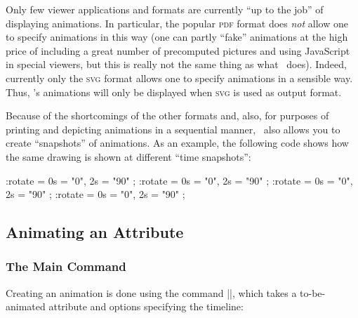 Only few viewer applications and formats are currently ``up to the job'' of
displaying animations.  In particular, the popular \textsc{pdf} format does
\emph{not} allow one to specify animations in this way (one can partly ``fake''
animations at the high price of including a great number of precomputed
pictures and using JavaScript in special viewers, but this is really not the
same thing as what \pgfname\ does). Indeed, currently only the  \textsc{svg}
format allows one to specify animations in a sensible way. Thus, \pgfname's
animations will only be displayed when \textsc{svg} is used as output format.

Because of the shortcomings of the other formats and, also, for purposes of
printing and depicting animations in a sequential manner, \pgfname\ also allows
you to create ``snapshots'' of animations. As an example, the following code
shows how the same drawing is shown at different ``time snapshots'':
%
\begin{codeexample}[width=3.9cm]
\tikz [make snapshot of=0.5s] \scoped :rotate = { 0s = "0", 2s = "90" }
  \node [draw=blue, very thick] {\pgfname};
\tikz [make snapshot of=1s]   \scoped :rotate = { 0s = "0", 2s = "90" }
  \node [draw=blue, very thick] {\pgfname};
\tikz [make snapshot of=1.5s] \scoped :rotate = { 0s = "0", 2s = "90" }
  \node [draw=blue, very thick] {\pgfname};
\tikz [make snapshot of=2s]   \scoped :rotate = { 0s = "0", 2s = "90" }
  \node [draw=blue, very thick] {\pgfname};
\end{codeexample}


\subsection{Animating an Attribute}

\subsubsection{The Main Command}

Creating an animation is done using the command |\pgfanimateattribute|, which
takes a to-be-animated attribute and options specifying the timeline:

